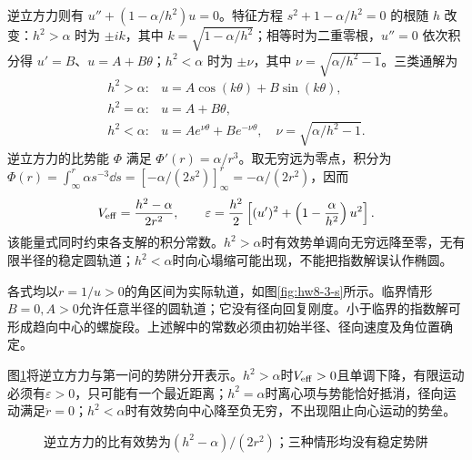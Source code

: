 \begin{solution}
逆立方力则有 $u''+(1-\alpha/h^2)u=0$。特征方程 $s^2+1-\alpha/h^2=0$ 的根随 $h$ 改变：$h^2>\alpha$ 时为 $\pm ik$，其中 $k=\sqrt{1-\alpha/h^2}$；相等时为二重零根，$u''=0$ 依次积分得 $u'=B$、$u=A+B\theta$；$h^2<\alpha$ 时为 $\pm\nu$，其中 $\nu=\sqrt{\alpha/h^2-1}$。三类通解为
\[
 \boxed{\begin{array}{ll}
 h^2>\alpha:&u=A\cos(k\theta)+B\sin(k\theta),\\
 h^2=\alpha:&u=A+B\theta,\\
 h^2<\alpha:&u=Ae^{\nu\theta}+Be^{-\nu\theta},\quad
 \nu=\sqrt{\alpha/h^2-1}.
 \end{array}}
\]
逆立方力的比势能 $\Phi$ 满足 $\Phi'(r)=\alpha/r^3$。取无穷远为零点，积分为 $\Phi(r)=\int_\infty^r\alpha s^{-3}\dd s=[-\alpha/(2s^2)]_\infty^r=-\alpha/(2r^2)$，因而
\[
 V_{\rm eff}=\frac{h^2-\alpha}{2r^2},\qquad
 \varepsilon=\frac{h^2}{2}\left[(u')^2+
 \left(1-\frac\alpha{h^2}\right)u^2\right].
\]
该能量式同时约束各支解的积分常数。$h^2>\alpha$时有效势单调向无穷远降至零，无有限半径的稳定圆轨道；$h^2<\alpha$时向心塌缩可能出现，不能把指数解误认作椭圆。

各式均以$r=1/u>0$的角区间为实际轨道，如图\ref{fig:hw8-3-s}所示。临界情形$B=0,A>0$允许任意半径的圆轨道；它没有径向回复刚度。小于临界的指数解可形成趋向中心的螺旋段。上述解中的常数必须由初始半径、径向速度及角位置确定。


图\ref{fig:review8-potential}将逆立方力与第一问的势阱分开表示。$h^2>\alpha$时$V_{\rm eff}>0$且单调下降，有限运动必须有$\varepsilon>0$，只可能有一个最近距离；$h^2=\alpha$时离心项与势能恰好抵消，径向运动满足$\ddot r=0$；$h^2<\alpha$时有效势向中心降至负无穷，不出现阻止向心运动的势垒。

\begin{figure}[H]\centering
{}
\caption{逆立方力的比有效势为$(h^2-\alpha)/(2r^2)$；三种情形均没有稳定势阱}\label{fig:review8-potential}
\end{figure}


\end{solution}
